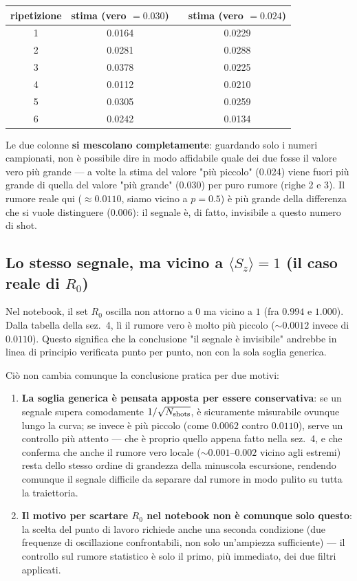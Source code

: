 \documentclass[11pt,a4paper]{article}
\begin{document}
\begin{center}
\renewcommand{\arraystretch}{1.2}
\begin{tabular}{@{}cccc@{}}
\toprule
\rowcolor{inkblue!10}
ripetizione & stima (vero $=0.030$) & & stima (vero $=0.024$)\\
\midrule
1 & 0.0164 & & 0.0229\\
2 & 0.0281 & & 0.0288\\
3 & 0.0378 & & 0.0225\\
4 & 0.0112 & & 0.0210\\
5 & 0.0305 & & 0.0259\\
6 & 0.0242 & & 0.0134\\
\bottomrule
\end{tabular}
\end{center}

Le due colonne \textbf{si mescolano completamente}: guardando solo i
numeri campionati, non è possibile dire in modo affidabile quale dei
due fosse il valore vero più grande --- a volte la stima del valore
"più piccolo" (0.024) viene fuori più grande di quella del valore "più
grande" (0.030) per puro rumore (righe 2 e 3). Il rumore reale qui
($\approx0.0110$, siamo vicino a $p=0.5$) è più grande della differenza
che si vuole distinguere ($0.006$): il segnale è, di fatto, invisibile
a questo numero di shot.

\subsection*{Lo stesso segnale, ma vicino a $\langle S_z\rangle=1$ (il caso reale di $R_0$)}

Nel notebook, il set $R_0$ oscilla non attorno a $0$ ma vicino a $1$
(fra $0.994$ e $1.000$). Dalla tabella della sez.~4, lì il rumore vero
è molto più piccolo ($\sim0.0012$ invece di $0.0110$). Questo significa
che la conclusione "il segnale è invisibile" andrebbe in linea di
principio verificata punto per punto, non con la sola soglia generica.

Ciò non cambia comunque la conclusione pratica per due motivi:
\begin{enumerate}[leftmargin=1.4em,itemsep=0.25em]
\item \textbf{La soglia generica è pensata apposta per essere
conservativa}: se un segnale supera comodamente
$1/\sqrt{N_{\rm shots}}$, è sicuramente misurabile ovunque lungo la
curva; se invece è più piccolo (come $0.0062$ contro $0.0110$), serve
un controllo più attento --- che è proprio quello appena fatto nella
sez.~4, e che conferma che anche il rumore vero locale
($\sim0.001$--$0.002$ vicino agli estremi) resta dello stesso ordine di
grandezza della minuscola escursione, rendendo comunque il segnale
difficile da separare dal rumore in modo pulito su tutta la
traiettoria.
\item \textbf{Il motivo per scartare $R_0$ nel notebook non è comunque
solo questo}: la scelta del punto di lavoro richiede anche una seconda
condizione (due frequenze di oscillazione confrontabili, non solo
un'ampiezza sufficiente) --- il controllo sul rumore statistico è solo
il primo, più immediato, dei due filtri applicati.
\end{enumerate}
\end{document}
